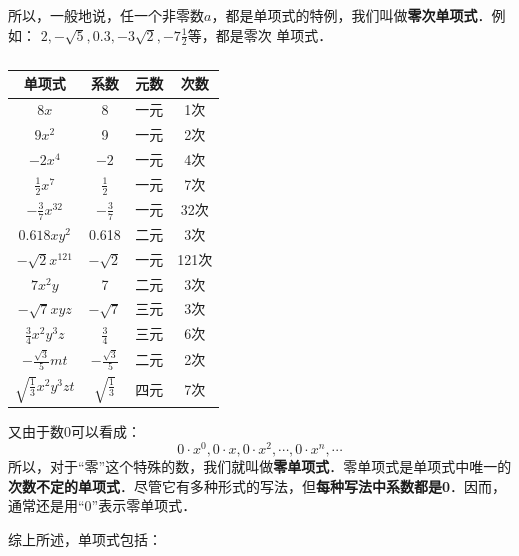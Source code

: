 所以，一般地说，任一个非零数$a$，都是单项式的特例，我们叫做\textbf{零次单项式}．例如：
$2,-\sqrt{5}, 0.3,-3\sqrt{2},-7\frac{1}{2}$等，都是零次
单项式．
\begin{table}
    \caption{}
    \begin{center}
        \renewcommand{\arraystretch}{2}
        \begin{tabular}{cccc}
            \hline
            单项式&        系数& 元数&        次数 \\
            \hline
            $8x$& 8& 一元 & 1次\\
            $9x^2$& 9& 一元 & 2次\\
            $-2x^4$& $-2$& 一元 & 4次\\
            $\frac{1}{2}x^7$& $\frac{1}{2}$& 一元 & 7次\\
            $-\frac{3}{7}x^{32}$& $-\frac{3}{7}$& 一元 & 32次\\
            $0.618xy^2$& 0.618 & 二元& 3次  \\
            $-\sqrt{2}x^{121}$& $-\sqrt{2}$ & 一元& 121次     \\
             $7x^2y$ & 7 & 二元& 3次    \\
              $-\sqrt{7}xyz$ & $-\sqrt{7}$ & 三元& 3次     \\
              $\frac{3}{4}x^2y^3z$  & $\frac{3}{4}$ & 三元& 6次   \\
            $-\frac{\sqrt{3}}{5}mt$  & $-\frac{\sqrt{3}}{5}$ & 二元& 2次   \\
            $\sqrt{\frac{1}{3}}x^2y^3zt$  & $\sqrt{\frac{1}{3}}$ & 四元& 7次    \\
            \hline
        \end{tabular}
    \end{center}
\end{table}



又由于数0可以看成：
\[0\cdot x^0, 0\cdot x, 0\cdot x^2, \cdots , 0\cdot x^n, \cdots\]
所以，对于“零”这个特殊的数，我们就叫做\textbf{零单项式}．零单项式是单项式中唯一的\textbf{次数不定的单项式}．尽管它有多种形式的写法，但\textbf{每种写法中系数都是0}．因而，通常还是用“0”表示零单项式．

综上所述，单项式包括：
\begin{center}
\end{center}

